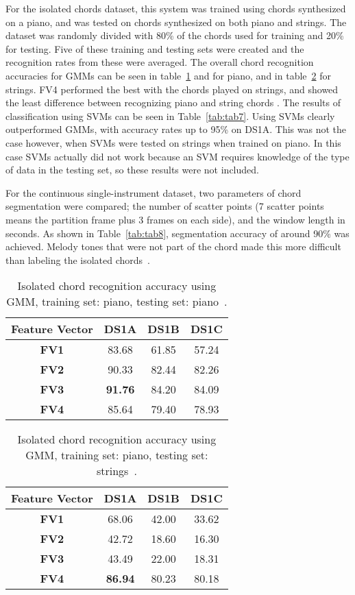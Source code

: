 \documentclass{sig-alternate}
\begin{document}
For the isolated chords dataset, this system was trained using chords synthesized on a piano, and was tested on chords synthesized on both piano and strings. The dataset was randomly divided with 80\% of the chords used for training and 20\% for testing. Five of these training and testing sets were created and the recognition rates from these were averaged. The overall chord recognition accuracies for GMMs can be seen in table~\ref{tab:tab3} and for piano, and in table~\ref{tab:tab4} for strings. FV4 performed the best with the chords played on strings, and showed the least difference between recognizing piano and string chords \cite{Morman:2006}. The results of classification using SVMs can be seen in Table~\ref{tab:tab7}. Using SVMs clearly outperformed GMMs, with accuracy rates up to 95\% on DS1A. This was not the case however, when SVMs were tested on strings when trained on piano. In this case SVMs actually did not work because an SVM requires knowledge of the type of data in the testing set, so these results were not included.  

For the continuous single-instrument dataset, two parameters of chord segmentation were compared; the number of scatter points (7 scatter points means the partition frame plus 3 frames on each side), and the window length in seconds. As shown in Table~\ref{tab:tab8}, segmentation accuracy of around 90\% was achieved. Melody tones that were not part of the chord made this more difficult than labeling the isolated chords~\cite{Morman:2006}. 

\begin{table}
\centering
\begin{tabular}{|c|c|c|c|} \hline
\textbf{Feature Vector} & \textbf{DS1A} & \textbf{DS1B} & \textbf{DS1C} \\ \hline
\textbf{FV1} & 83.68 & 61.85 & 57.24 \\ \hline
\textbf{FV2} & 90.33 & 82.44 & 82.26 \\ \hline
\textbf{FV3} & \textbf{91.76} & 84.20 & 84.09 \\ \hline
\textbf{FV4} & 85.64 & 79.40 & 78.93 \\ \hline
\end{tabular}
\caption{Isolated chord recognition accuracy using GMM, training set: piano, testing set: piano~\cite{Morman:2006}.}
\label{tab:tab3}
\end{table} 

\begin{table}
\centering
\begin{tabular}{|c|c|c|c|} \hline
\textbf{Feature Vector} & \textbf{DS1A} & \textbf{DS1B} & \textbf{DS1C} \\ \hline
\textbf{FV1} & 68.06 & 42.00 & 33.62 \\ \hline
\textbf{FV2} & 42.72 & 18.60 & 16.30 \\ \hline
\textbf{FV3} & 43.49 & 22.00 & 18.31 \\ \hline
\textbf{FV4} & \textbf{86.94} & 80.23 & 80.18 \\ \hline
\end{tabular}
\caption{Isolated chord recognition accuracy using GMM, training set: piano, testing set: strings~\cite{Morman:2006}.}
\label{tab:tab4}
\end{table}
\end{document}

